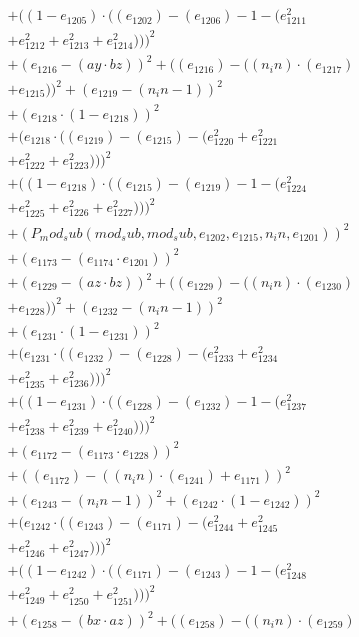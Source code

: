 \documentclass[10pt, a4paper]{article}
\begin{document}
\begin{small}
\begin{align*}
& + ((1 - e_{1205})  \cdot  ((e_{1202}) - (e_{1206}) - 1 - (e_{1211}^{2} \\
& + e_{1212}^{2} + e_{1213}^{2} + e_{1214}^{2})))^{2} \\
& + (e_{1216} - (ay  \cdot  bz))^{2} + ((e_{1216}) - ((n_in)  \cdot  (e_{1217}) \\
& + e_{1215}))^{2} + (e_{1219} - (n_in - 1))^{2} \\
& + (e_{1218}  \cdot  (1 - e_{1218}))^{2} \\
& + (e_{1218}  \cdot  ((e_{1219}) - (e_{1215}) - (e_{1220}^{2} + e_{1221}^{2} \\
& + e_{1222}^{2} + e_{1223}^{2})))^{2} \\
& + ((1 - e_{1218})  \cdot  ((e_{1215}) - (e_{1219}) - 1 - (e_{1224}^{2} \\
& + e_{1225}^{2} + e_{1226}^{2} + e_{1227}^{2})))^{2} \\
& + (P_mod_sub(mod_sub, mod_sub, e_{1202}, e_{1215}, n_in, e_{1201}))^{2} \\
& + (e_{1173} - (e_{1174}  \cdot  e_{1201}))^{2} \\
& + (e_{1229} - (az  \cdot  bz))^{2} + ((e_{1229}) - ((n_in)  \cdot  (e_{1230}) \\
& + e_{1228}))^{2} + (e_{1232} - (n_in - 1))^{2} \\
& + (e_{1231}  \cdot  (1 - e_{1231}))^{2} \\
& + (e_{1231}  \cdot  ((e_{1232}) - (e_{1228}) - (e_{1233}^{2} + e_{1234}^{2} \\
& + e_{1235}^{2} + e_{1236}^{2})))^{2} \\
& + ((1 - e_{1231})  \cdot  ((e_{1228}) - (e_{1232}) - 1 - (e_{1237}^{2} \\
& + e_{1238}^{2} + e_{1239}^{2} + e_{1240}^{2})))^{2} \\
& + (e_{1172} - (e_{1173}  \cdot  e_{1228}))^{2} \\
& + ((e_{1172}) - ((n_in)  \cdot  (e_{1241}) + e_{1171}))^{2} \\
& + (e_{1243} - (n_in - 1))^{2} + (e_{1242}  \cdot  (1 - e_{1242}))^{2} \\
& + (e_{1242}  \cdot  ((e_{1243}) - (e_{1171}) - (e_{1244}^{2} + e_{1245}^{2} \\
& + e_{1246}^{2} + e_{1247}^{2})))^{2} \\
& + ((1 - e_{1242})  \cdot  ((e_{1171}) - (e_{1243}) - 1 - (e_{1248}^{2} \\
& + e_{1249}^{2} + e_{1250}^{2} + e_{1251}^{2})))^{2} \\
& + (e_{1258} - (bx  \cdot  az))^{2} + ((e_{1258}) - ((n_in)  \cdot  (e_{1259}) \\

\end{align*}
\end{small}
\end{document}
